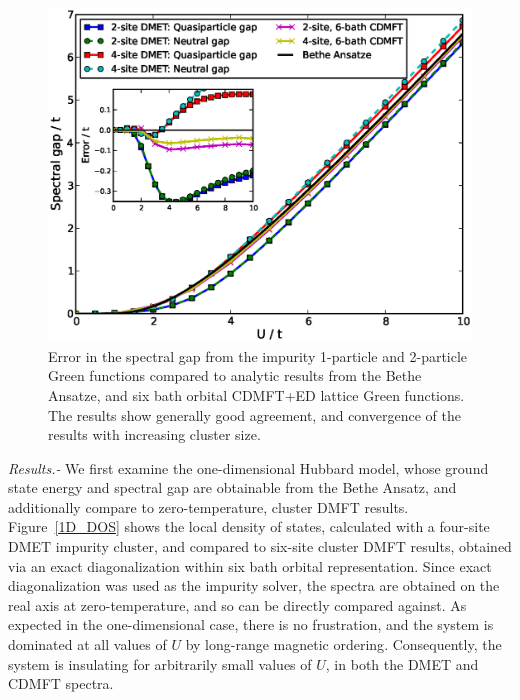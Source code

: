 \documentclass[aps,twocolumn,nobibnotes]{revtex4}
\begin{document}
\begin{figure}
\begin{center}
    \vspace{-2mm}
\includegraphics[scale=0.425]{Hubbard_Gap.eps}
\end{center}
    \vspace{-8mm}
\caption{Error in the spectral gap from the impurity 1-particle and 2-particle Green functions compared to analytic results
from the Bethe Ansatze\cite{Ovchinni1970}, and six bath orbital CDMFT+ED lattice Green functions. The results show generally 
good agreement, and convergence of the results with increasing cluster size.}
\label{1D_GAP}
\end{figure}

\emph{Results.-} We first examine the one-dimensional Hubbard model, whose ground state energy\cite{Lieb68} and spectral gap\cite{Ovchinni1970} are 
obtainable from the Bethe Ansatz, and additionally compare to
zero-temperature, cluster DMFT results\cite{Go2009}. Figure~\ref{1D_DOS} shows the local density of states, calculated with a four-site DMET 
impurity cluster, and compared to six-site cluster DMFT results, obtained via an exact diagonalization within six bath orbital representation. 
Since exact diagonalization was used as the impurity solver, 
the spectra are obtained on the real axis at zero-temperature, and so can be directly compared against. As expected in the one-dimensional case, there is no
frustration, and the system is dominated at all values of $U$ by long-range magnetic ordering\cite{Lieb68}. Consequently, 
the system is insulating for arbitrarily small values of $U$, in both the DMET and CDMFT spectra. 
\end{document}
